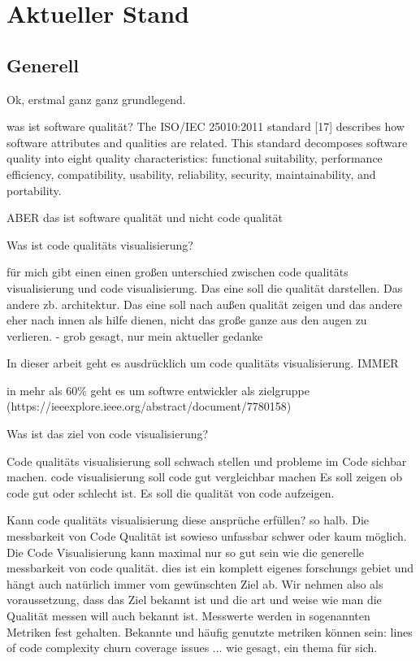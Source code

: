 \section{Aktueller Stand}\label{sec:aktStand}

\subsection{Generell}
Ok, erstmal ganz ganz grundlegend. 

was ist software qualität?
The ISO/IEC 25010:2011 standard [17] describes how software attributes and qualities are related. This standard decomposes software quality into eight quality characteristics:
functional suitability, performance efficiency, compatibility,
usability, reliability, security, maintainability, and portability.

ABER das ist software qualität und nicht code qualität


Was ist code qualitäts visualisierung?

für mich gibt einen einen großen unterschied zwischen code qualitäts visualisierung und code visualisierung.
Das eine soll die qualität darstellen. Das andere zb. architektur.
Das eine soll nach außen qualität zeigen und das andere eher nach innen als hilfe dienen, nicht das große ganze aus den augen zu verlieren. - grob gesagt, nur mein aktueller gedanke

In dieser arbeit geht es ausdrücklich um code qualitäts visualisierung. IMMER 

in mehr als 60\% geht es um softwre entwickler als zielgruppe (https://ieeexplore.ieee.org/abstract/document/7780158)

Was ist das ziel von code visualisierung?

Code qualitäts visualisierung soll schwach stellen und probleme im Code sichbar machen.
code visualisierung soll code gut vergleichbar machen
Es soll zeigen ob code gut oder schlecht ist.
Es soll die qualität von code aufzeigen.


Kann code qualitäts visualisierung diese ansprüche erfüllen?
so halb. Die messbarkeit von Code Qualität ist sowieso unfassbar schwer oder kaum möglich. Die Code Visualisierung kann maximal nur so gut sein wie die generelle messbarkeit von code qualität. dies ist ein komplett eigenes forschungs gebiet und hängt auch natürlich immer vom gewünschten Ziel ab.
Wir nehmen also als voraussetzung, dass das Ziel bekannt ist und die art und weise wie man die Qualität messen will auch bekannt ist.
Messwerte werden in sogenannten Metriken fest gehalten.
Bekannte und häufig genutzte metriken können sein:
lines of code
complexity
churn
coverage
issues ...
wie gesagt, ein thema für sich.


